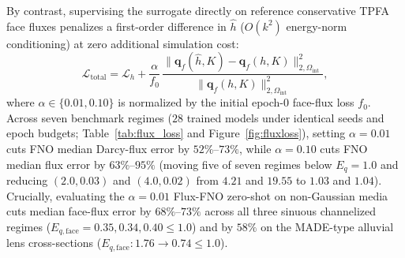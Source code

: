 \documentclass[preprint,12pt,authoryear]{elsarticle}
\begin{document}
By contrast, supervising the surrogate directly on reference conservative TPFA face fluxes penalizes a first-order difference in $\hat{h}$ ($O(k^2)$ energy-norm conditioning) at zero additional simulation cost:
\begin{equation}
  \mathcal{L}_{\text{total}} = \mathcal{L}_h + \frac{\alpha}{f_0}\,\frac{\|\mathbf{q}_f(\hat{h}, K) - \mathbf{q}_f(h, K)\|_{2,\Omega_{\text{int}}}^2}{\|\mathbf{q}_f(h, K)\|_{2,\Omega_{\text{int}}}^2},
  \label{eq:flux_loss}
\end{equation}
where $\alpha \in \{0.01, 0.10\}$ is normalized by the initial epoch-0 face-flux loss $f_0$. Across seven benchmark regimes ($28$ trained models under identical seeds and epoch budgets; Table~\ref{tab:flux_loss} and Figure~\ref{fig:fluxloss}), setting $\alpha = 0.01$ cuts FNO median Darcy-flux error by $52\%$--$73\%$, while $\alpha = 0.10$ cuts FNO median flux error by $63\%$--$95\%$ (moving five of seven regimes below $E_q = 1.0$ and reducing $(2.0, 0.03)$ and $(4.0, 0.02)$ from $4.21$ and $19.55$ to $1.03$ and $1.04$). Crucially, evaluating the $\alpha = 0.01$ Flux-FNO zero-shot on non-Gaussian media cuts median face-flux error by $68\%$--$73\%$ across all three sinuous channelized regimes ($E_{q,\text{face}} = 0.35, 0.34, 0.40 \le 1.0$) and by $58\%$ on the MADE-type alluvial lens cross-sections ($E_{q,\text{face}}: 1.76 \to 0.74 \le 1.0$).
\end{document}

